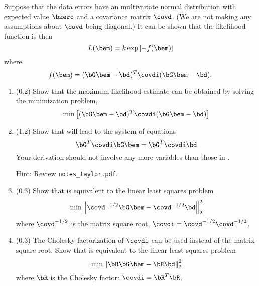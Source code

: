 \documentclass[11pt,titlepage,fleqn]{article}
\begin{document}
Suppose that the data errors have an multivariate normal distribution with expected value $\bzero$ and a covariance matrix $\covd$. (We are not making any assumptions about $\covd$ being diagonal.) It can be shown that the likelihood function is then
%
\begin{equation}
L(\bem) = k \exp \left[ -f(\bem) \right]
\end{equation}
%
where
%
\begin{equation}
f(\bem) = (\bG\bem - \bd)^T \covdi (\bG\bem - \bd).
\label{fm}
\end{equation}
%
\begin{enumerate}
\item (0.2) Show that the maximum likelihood estimate can be obtained by solving the minimization problem,
%
\begin{equation}
\min \left[ (\bG\bem - \bd)^T \covdi (\bG\bem - \bd) \right]
\label{min}
\end{equation}


\item (1.2) Show that  will lead to the system of equations
%
\begin{equation}
\bG^T \covdi \bG \bem = \bG^T \covdi \bd
\end{equation}
%
Your derivation should not involve any more variables than those in .

Hint: Review \verb+notes_taylor.pdf+.


\item (0.3) Show that  is equivalent to the linear least squares problem
%
\begin{equation}
\min\left\|  \covd^{-1/2}\bG\bem - \covd^{-1/2}\bd  \right\|_2^2
\end{equation}
%
where $\covd^{-1/2}$ is the matrix square root, \ie $\covdi = \covd^{-1/2} \covd^{-1/2}$.


\item (0.3) The Cholesky factorization of $\covdi$ can be used instead of the matrix square root. Show that  is equivalent to the linear least squares problem
%
\begin{equation}
\min\left\|  \bR\bG\bem - \bR\bd  \right\|_2^2
\end{equation}
%
where $\bR$ is the Cholesky factor: $\covdi = \bR^T\bR$.

\end{enumerate}
\end{document}
